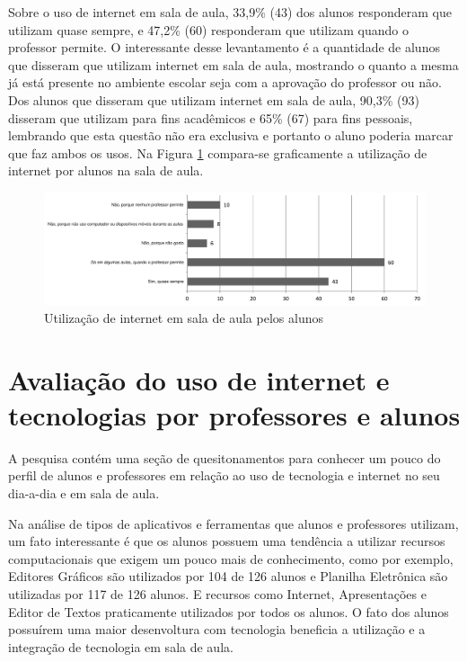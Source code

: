 Sobre o uso de internet em sala de aula, 33,9\% (43) dos alunos responderam que utilizam quase sempre, e 47,2\% (60) responderam que utilizam quando o professor permite. O interessante desse levantamento é a quantidade de alunos que disseram que utilizam internet em sala de aula, mostrando o quanto a mesma já está presente no ambiente escolar seja com a aprovação do professor ou não. Dos alunos que disseram que utilizam internet em sala de aula, 90,3\% (93) disseram que utilizam para fins acadêmicos e 65\% (67) para fins pessoais, lembrando que esta questão não era exclusiva e portanto o aluno poderia marcar que faz ambos os usos. Na Figura \ref{fig:grafico_uso_internet_alunos_sala} compara-se graficamente a utilização de internet por alunos na sala de aula.

\begin{figure}[!h]
\centering
\includegraphics[width=1.0\textwidth]{pdfs/alunos-professores/pesquisa-alunos-uso-internet-sala.pdf} 
\caption{Utilização de internet em sala de aula pelos alunos}
\label{fig:grafico_uso_internet_alunos_sala} 
\end{figure}




\section{Avaliação do uso de internet e tecnologias por professores e alunos}

A pesquisa contém uma seção de quesitonamentos para conhecer um pouco do perfil de alunos e professores em relação ao uso de tecnologia e internet no seu dia-a-dia e em sala de aula. 

Na análise de tipos de aplicativos e ferramentas que alunos e professores utilizam, um fato interessante é que os alunos possuem uma tendência a utilizar recursos computacionais que exigem um pouco mais de conhecimento, como por exemplo, Editores Gráficos são utilizados por 104 de 126 alunos e Planilha Eletrônica são utilizadas por 117 de 126 alunos. E recursos como Internet, Apresentações e Editor de Textos praticamente utilizados por todos os alunos. O fato dos alunos possuírem uma maior desenvoltura com tecnologia beneficia a utilização e a integração de tecnologia em sala de aula.

